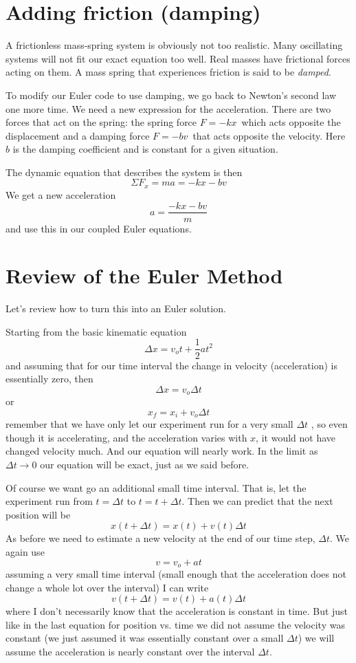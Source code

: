 \documentclass[twoside,11pt,ShortChapTitles]{BYUTextbook}
\begin{document}
\section{Adding friction (damping)}

A frictionless mass-spring system is obviously not too realistic. Many
oscillating systems will not fit our exact equation too well. Real masses
have frictional forces acting on them. A mass spring that experiences
friction is said to be \emph{damped}.

To modify our Euler code to use damping, we go back to Newton's second law
one more time. We need a new expression for the acceleration. There are two
forces that act on the spring: the spring force $F=-kx$\ which acts opposite
the displacement and a damping force $F=-bv$\ that acts opposite the
velocity. Here $b$ is the damping coefficient and is constant for a given
situation.

The dynamic equation that describes the system is then 
\[
\Sigma F_{x}=ma=-kx-bv 
\]%
We get a new acceleration 
\[
a=\frac{-kx-bv}{m} 
\]%
and use this in our coupled Euler equations.

\section{Review of the Euler Method}

Let's review how to turn this into an Euler solution.

Starting from the basic kinematic equation%
\[
\Delta x=v_{o}t+\frac{1}{2}at^{2} 
\]%
and assuming that for our time interval the change in velocity
(acceleration) is essentially zero, then 
\[
\Delta x=v_{o}\Delta t 
\]%
or%
\[
x_{f}=x_{i}+v_{o}\Delta t 
\]%
remember that we have only let our experiment run for a very small $\Delta t$%
, so even though it is accelerating, and the acceleration varies with $x$,
it would not have changed velocity much. And our equation will nearly work.
In the limit as $\Delta t\rightarrow 0$ our equation will be exact, just as
we said before.

Of course we want go an additional small time interval. That is, let the
experiment run from $t=\Delta t$ to $t=t+\Delta t.$ Then we can predict that
the next position will be 
\[
x(t+\Delta t)=x(t)+v(t)\Delta t 
\]%
As before we need to estimate a new velocity at the end of our time step, $%
\Delta t.$ We again use 
\[
v=v_{o}+at 
\]%
assuming a very small time interval (small enough that the acceleration does
not change a whole lot over the interval) I can write 
\[
v(t+\Delta t)=v(t)+a(t)\Delta t 
\]%
where I don't necessarily know that the acceleration is constant in time.
But just like in the last equation for position vs. time we did not assume
the velocity was constant (we just assumed it was essentially constant over
a small $\Delta t$) we will assume the acceleration is nearly constant over
the interval $\Delta t.$
\end{document}
